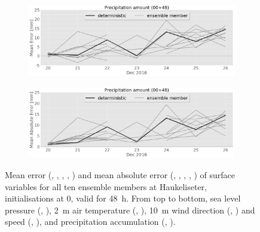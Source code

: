 \begin{figure}
\begin{subfigure}[b]{0.49\textwidth}
			\caption{}\label{fig:MAE:ws}
		\end{subfigure}
		\begin{subfigure}[b]{0.49\textwidth}
			\includegraphics[width=\textwidth]{./fig_sfc_precip/ME_20161220_26_00}
			\caption{}\label{fig:bias:precip}
		\end{subfigure}
        \begin{subfigure}[b]{0.49\textwidth}
			\includegraphics[width=\textwidth]{./fig_sfc_precip/MAE_20161220_26_00}
			\caption{}\label{fig:MAE:precip}
		\end{subfigure}
		
    \caption{Mean error (\protect{}, \protect{}, \protect{}, \protect{}, \protect{}) and mean absolute error (\protect{}, \protect{}, \protect{}, \protect{}, \protect{}) of surface variables for all ten ensemble members at Haukeliseter, initialisations at \SI{0}{\UTC}, valid for \SI{48}{\hour}. From top to bottom, sea level pressure (\protect{}, \protect{}), \SI{2}{\metre} air temperature (\protect{}, \protect{}), \SI{10}{\metre} wind direction (\protect{}, \protect{}) and speed (\protect{}, \protect{}), and precipitation accumulation (\protect{}, \protect{}). }\label{fig:bias_MAE}
	\end{figure}
